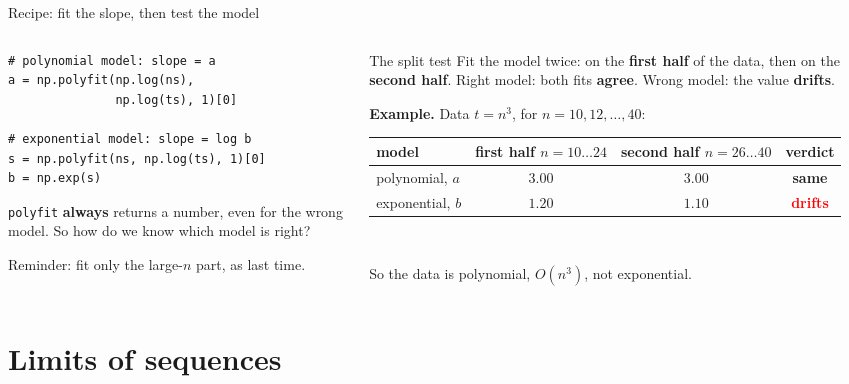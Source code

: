 \documentclass[aspectratio=169]{beamer}
\begin{document}
\begin{frame}[fragile]{Recipe: fit the slope, then test the model}
\begin{columns}[T]
\begin{column}{0.44\textwidth}
\begin{lstlisting}[basicstyle=\ttfamily\scriptsize]
# polynomial model: slope = a
a = np.polyfit(np.log(ns),
               np.log(ts), 1)[0]

# exponential model: slope = log b
s = np.polyfit(ns, np.log(ts), 1)[0]
b = np.exp(s)
\end{lstlisting}
\small
\texttt{polyfit} \textbf{always} returns a number, even for the wrong model. So how do we know which model is right?
\vspace{6pt}

\scriptsize Reminder: fit only the large-$n$ part, as last time.
\end{column}
\begin{column}{0.53\textwidth}
\begin{exampleblock}{The split test}
\small Fit the model twice: on the \textbf{first half} of the data, then on the \textbf{second half}. Right model: both fits \textbf{agree}. Wrong model: the value \textbf{drifts}.
\end{exampleblock}
\footnotesize \textbf{Example.} Data $t = n^3$, for $n = 10, 12, \ldots, 40$:\\[3pt]
\centering
\renewcommand{\arraystretch}{1.15}
\scriptsize
\begin{tabular}{lccc}
\toprule
model & \shortstack{first half\\$n = 10\ldots24$} & \shortstack{second half\\$n = 26\ldots40$} & verdict \\
\midrule
polynomial, $a$ & $3.00$ & $3.00$ & \textcolor{green!50!black}{\textbf{same}} \\
exponential, $b$ & $1.20$ & $1.10$ & \textcolor{red}{\textbf{drifts}} \\
\bottomrule
\end{tabular}\\[3pt]
\raggedright \footnotesize So the data is polynomial, $O(n^3)$, not exponential.
\end{column}
\end{columns}
\end{frame}

\section{Limits of sequences}
\end{document}
